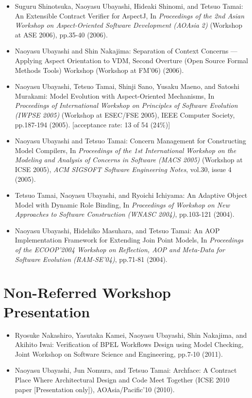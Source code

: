 \documentclass{article}
\begin{document}
\begin{itemize}
\item Suguru Shinotsuka, Naoyasu Ubayashi, Hideaki Shinomi, and Tetsuo Tamai:
An Extensible Contract Verifier for AspectJ,
In {\em Proceedings of the 2nd Asian Workshop on Aspect-Oriented Software Development (AOAsia 2)} (Workshop at ASE 2006),
pp.35-40 (2006).

\item Naoyasu Ubayashi and Shin Nakajima:
Separation of Context Concerns --- Applying Aspect Orientation to VDM,
Second Overture (Open Source Formal Methods Tools) Workshop (Workshop at FM'06)
(2006).

\item Naoyasu Ubayashi, Tetsuo Tamai, Shinji Sano, Yusaku Maeno, and Satoshi Murakami:
Model Evolution with Aspect-Oriented Mechanisms,
In {\em Proceedings of International Workshop on Principles of Software Evolution (IWPSE 2005)} (Workshop at ESEC/FSE 2005),
IEEE Computer Society,
pp.187-194 (2005).
[acceptance rate: 13 of 54 (24\%)]

\item Naoyasu Ubayashi and Tetsuo Tamai:
Concern Management for Constructing Model Compilers,
In {\em Proceedings of the 1st International Workshop on the Modeling and Analysis of Concerns in Software (MACS 2005)} (Workshop at ICSE 2005),
{\em ACM SIGSOFT Software Engineering Notes}, vol.30, issue 4 (2005).

\item Tetsuo Tamai, Naoyasu Ubayashi, and Ryoichi Ichiyama:
An Adaptive Object Model with Dynamic Role Binding,
In {\em Proceedings of Workshop on New Approaches to Software Construction (WNASC 2004)},
pp.103-121 (2004).

\item Naoyasu Ubayashi, Hidehiko Masuhara, and Tetsuo Tamai:
An AOP Implementation Framework for Extending Join Point Models,
In {\em Proceedings of the ECOOP'2004 Workshop on Reflection, AOP and Meta-Data for Software Evolution (RAM-SE'04)},
pp.71-81 (2004).
\end{itemize}


\section{Non-Referred Workshop Presentation}

\begin{itemize}
\item Ryosuke Nakashiro, Yasutaka Kamei, Naoyasu Ubayashi, Shin Nakajima, and Akihito Iwai:
Verification of BPEL Workflows Design using Model Checking,
Joint Workshop on Software Science and Engineering,
pp.7-10 (2011).

\item Naoyasu Ubayashi, Jun Nomura, and Tetsuo Tamai:
Archface: A Contract Place Where Architectural Design and Code Meet Together (ICSE 2010 paper [Presentation only]),
AOAsia/Pacific'10 (2010).
\end{itemize}
\end{document}
